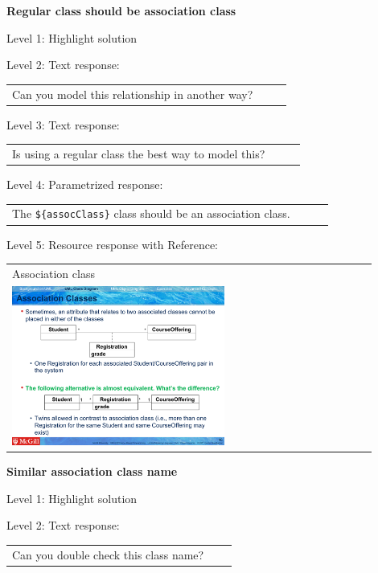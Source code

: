 \noindent \textbf{Regular class should be association class} \medskip

\noindent Level 1: Highlight solution \medskip

\noindent Level 2: Text response: \medskip

\begin{tabular}{|p{0.9\linewidth}}
Can you model this relationship in another way?
\end{tabular} \medskip

\noindent Level 3: Text response: \medskip

\begin{tabular}{|p{0.9\linewidth}}
Is using a regular class the best way to model this?
\end{tabular} \medskip

\noindent Level 4: Parametrized response: \medskip

\begin{tabular}{|p{0.9\linewidth}}
The \verb|${assocClass}| class should be an association class.
\end{tabular} \medskip

\noindent Level 5: Resource response with Reference: \medskip

\begin{tabular}{|p{0.9\linewidth}}
Association class

\\
\includegraphics[width=0.6\textwidth]{images/association_class.png}
\end{tabular} \medskip


\noindent \textbf{Similar association class name} \medskip

\noindent Level 1: Highlight solution \medskip

\noindent Level 2: Text response: \medskip

\begin{tabular}{|p{0.9\linewidth}}
Can you double check this class name?
\end{tabular} \medskip


